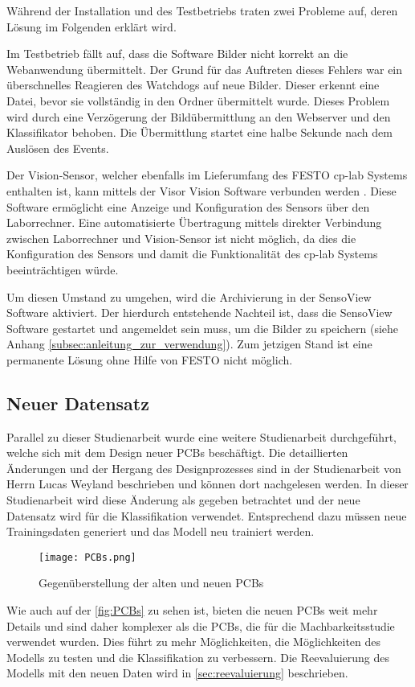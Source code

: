 Während der Installation und des Testbetriebs traten zwei Probleme auf, deren Lösung im Folgenden erklärt wird.

Im Testbetrieb fällt auf, dass die Software Bilder nicht korrekt an die Webanwendung übermittelt. Der Grund für das Auftreten dieses Fehlers war ein überschnelles Reagieren des Watchdogs auf neue Bilder. Dieser erkennt eine Datei, bevor sie vollständig in den Ordner übermittelt wurde. Dieses Problem wird durch eine Verzögerung der Bildübermittlung an den Webserver und den Klassifikator behoben. Die Übermittlung startet eine halbe Sekunde nach dem Auslösen des Events.

Der Vision-Sensor, welcher ebenfalls im Lieferumfang des FESTO \ac{cp-lab} Systems enthalten ist, kann mittels der Visor Vision Software verbunden werden \cite{sensopart_industriesensorik_gmbh_visor_2019}. Diese Software ermöglicht eine Anzeige und Konfiguration des Sensors über den Laborrechner. Eine automatisierte Übertragung mittels direkter Verbindung zwischen Laborrechner und Vision-Sensor ist nicht möglich, da dies die Konfiguration des Sensors und damit die Funktionalität des \ac{cp-lab} Systems beeinträchtigen würde.

Um diesen Umstand zu umgehen, wird die Archivierung in der SensoView Software aktiviert. Der hierdurch entstehende Nachteil ist, dass die SensoView Software gestartet und angemeldet sein muss, um die Bilder zu speichern (siehe Anhang \autoref{subsec:anleitung_zur_verwendung}). Zum jetzigen Stand ist eine permanente Lösung ohne Hilfe von FESTO nicht möglich.

\subsection{Neuer Datensatz} \label{subsec:neuer_datzensatz}

Parallel zu dieser Studienarbeit wurde eine weitere Studienarbeit durchgeführt, welche sich mit dem Design neuer \ac{PCB}s beschäftigt. Die detaillierten Änderungen und der Hergang des Designprozesses sind in der Studienarbeit von Herrn Lucas Weyland beschrieben und können dort nachgelesen werden. In dieser Studienarbeit wird diese Änderung als gegeben betrachtet und der neue Datensatz wird für die Klassifikation verwendet. Entsprechend dazu müssen neue Trainingsdaten generiert und das Modell neu trainiert werden.

\begin{figure}[H]
    \centering
    \texttt{[image: PCBs.png]}
    \caption{Gegenüberstellung der alten und neuen \ac{PCB}s}
    \label{fig:PCBs}
\end{figure}

Wie auch auf der \autoref{fig:PCBs} zu sehen ist, bieten die neuen PCBs weit mehr Details und sind daher komplexer als die \ac{PCB}s, die für die Machbarkeitsstudie verwendet wurden. 
Dies führt zu mehr Möglichkeiten, die Möglichkeiten des Modells zu testen und die Klassifikation zu verbessern. Die Reevaluierung des Modells mit den neuen Daten wird in \autoref{sec:reevaluierung} beschrieben.


